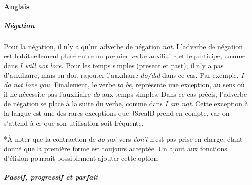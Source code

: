 \documentclass[11pt]{article} %
\newcommand{\system}[1]{\textsf{#1}}
\newcommand{\JSB}{\system{JSrealB}}
\begin{document}
\paragraph{Anglais}

\subparagraph{Négation}

Pour la négation, il n'y a qu'un adverbe de négation 
\emph{not. }L'adverbe de négation est habituellement placé entre un
premier verbe auxiliaire et le participe, comme dans \emph{I will
not love. }Pour les temps simples (present et past), il n'y a pas d'auxiliaire,
mais on doit rajouter l'auxiliaire \emph{do/did} dans ce cas. Par
exemple, \emph{I do not love you. }Finalement, le verbe \emph{to be},
représente une exception, au sens où il ne nécessite pas l'auxiliaire
\emph{do }aux temps simples. Dans ce cas précis, l'adverbe de négation
se place à la suite du verbe, comme dans \emph{I am not.} Cette exception
à la langue est une des rares exceptions que \JSB{} prend en compte,
car on s'attend à ce que son utilisation soit fréquente.

{*}À noter que la contraction de \emph{do not }vers \emph{don't} n'est
pas prise en charge, étant donné que la première forme est toujours
acceptée. Un ajout aux fonctions d'élision pourrait possiblement ajouter
cette option.
\subparagraph{Passif, progressif et parfait}
\end{document}
